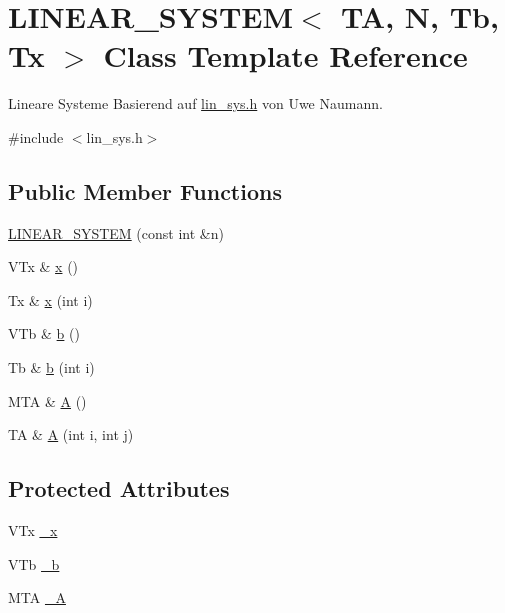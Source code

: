\hypertarget{class_l_i_n_e_a_r___s_y_s_t_e_m}{}\section{L\+I\+N\+E\+A\+R\+\_\+\+S\+Y\+S\+T\+EM$<$ TA, N, Tb, Tx $>$ Class Template Reference}
\label{class_l_i_n_e_a_r___s_y_s_t_e_m}


Lineare Systeme Basierend auf \mbox{\hyperlink{lin__sys_8h}{lin\+\_\+sys.\+h}} von Uwe Naumann.  




{\ttfamily \#include $<$lin\+\_\+sys.\+h$>$}

\subsection*{Public Member Functions}
\begin{DoxyCompactItemize}
\item 
\mbox{\hyperlink{class_l_i_n_e_a_r___s_y_s_t_e_m_a7486740300aa9998e1aa4f9d90790eb2}{L\+I\+N\+E\+A\+R\+\_\+\+S\+Y\+S\+T\+EM}} (const int \&n)
\item 
V\+Tx \& \mbox{\hyperlink{class_l_i_n_e_a_r___s_y_s_t_e_m_a0585adb67fae39d29e887d03d071fc74}{x}} ()
\item 
Tx \& \mbox{\hyperlink{class_l_i_n_e_a_r___s_y_s_t_e_m_ad00a0cae1d479dd527cc374c210b9429}{x}} (int i)
\item 
V\+Tb \& \mbox{\hyperlink{class_l_i_n_e_a_r___s_y_s_t_e_m_a6754b4aaf5db40c45522d289e969f917}{b}} ()
\item 
Tb \& \mbox{\hyperlink{class_l_i_n_e_a_r___s_y_s_t_e_m_ae7c2a505d8cd0c6eb4b49bc0ece4e233}{b}} (int i)
\item 
M\+TA \& \mbox{\hyperlink{class_l_i_n_e_a_r___s_y_s_t_e_m_a307c8896bb3218768f016a2a24de3bcd}{A}} ()
\item 
TA \& \mbox{\hyperlink{class_l_i_n_e_a_r___s_y_s_t_e_m_a5163aedcb567d591f5812bd3c892fb07}{A}} (int i, int j)
\end{DoxyCompactItemize}
\subsection*{Protected Attributes}
\begin{DoxyCompactItemize}
\item 
V\+Tx \mbox{\hyperlink{class_l_i_n_e_a_r___s_y_s_t_e_m_abc1a6ac63a5c66a14e47cdb22559fefa}{\+\_\+x}}
\item 
V\+Tb \mbox{\hyperlink{class_l_i_n_e_a_r___s_y_s_t_e_m_a2a040e59b49e900b61c4db4385623fd0}{\+\_\+b}}
\item 
M\+TA \mbox{\hyperlink{class_l_i_n_e_a_r___s_y_s_t_e_m_afee92f4a1bc570f9ead4742047756525}{\+\_\+A}}
\end{DoxyCompactItemize}


